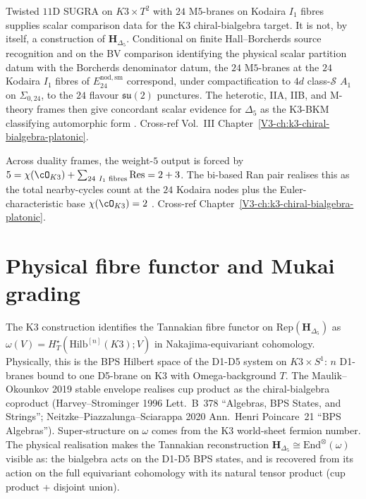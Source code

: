 \begin{remark}
\label{rem:htpo-1}
Twisted $11$D SUGRA on $K3\times T^2$ with $24$ M$5$-branes
on Kodaira $I_1$ fibres supplies scalar comparison data for the K3
chiral-bialgebra target. It is not, by itself, a construction of
$\mathbf H_{\Delta_5}$. Conditional on finite Hall--Borcherds source
recognition and on the BV comparison identifying the physical scalar
partition datum with the Borcherds denominator datum, the $24$
M$5$-branes at the $24$ Kodaira $I_1$ fibres of
$E^{\mathrm{nod,sm}}_{24}$ correspond, under compactification to $4d$
class-$\mathcal S$ $A_1$ on $\Sigma_{0,24}$, to the $24$ flavour
$\mathfrak{su}(2)$ punctures. The heterotic, IIA, IIB, and M-theory
frames then give concordant scalar evidence for $\Delta_5$ as the
K3-BKM classifying automorphic form
\cite{EguchiOoguriTachikawa2010,Gaiotto2009}. Cross-ref Vol.~III
Chapter~\ref{V3-ch:k3-chiral-bialgebra-platonic}.
\end{remark}

\begin{remark}
\label{rem:htpo-2}
Across duality frames, the weight-$5$ output is forced by
$5 = \chi(\cO_{K3}) + \sum_{24\ I_1\text{ fibres}}\mathrm{Res} = 2 + 3$.
The bi-based Ran pair realises this as the total nearby-cycles count
at the $24$ Kodaira nodes plus the Euler-characteristic base
$\chi(\cO_{K3}) = 2$ \cite{KugaSatake1967,Borcherds1992}. Cross-ref
Chapter~\ref{V3-ch:k3-chiral-bialgebra-platonic}.
\end{remark}

\section{Physical fibre functor and Mukai grading}
\label{sec:htpo-supplement-ii}

\begin{remark}
\label{rem:htpo-physical-omega}
The K3 construction identifies the Tannakian fibre functor on
$\mathrm{Rep}(\mathbf H_{\Delta_5})$ as
$\omega(V) = H^\star_T(\mathrm{Hilb}^{[n]}(K3); V)$ in
Nakajima-equivariant cohomology. Physically, this is the BPS
Hilbert space of the D1-D5 system on $K3 \times S^1$:
$n$ D1-branes bound to one D5-brane on K3 with Omega-background $T$.
The Maulik--Okounkov 2019 stable envelope realises cup product as
the chiral-bialgebra coproduct (Harvey--Strominger 1996 Lett.~B~378
``Algebras, BPS States, and Strings''; Neitzke--Piazzalunga--Sciarappa
2020 Ann.~Henri Poincare~21 ``BPS Algebras''). Super-structure on
$\omega$ comes from the K3 world-sheet fermion number. The physical
realisation makes the Tannakian reconstruction
$\mathbf H_{\Delta_5} \cong \mathrm{End}^\otimes(\omega)$ visible as:
the bialgebra acts on the D1-D5 BPS states, and is recovered from
its action on the full equivariant cohomology with its natural
tensor product (cup product + disjoint union).
\end{remark}

